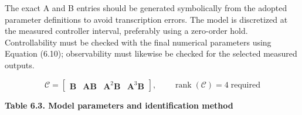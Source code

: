 The exact A and B entries should be generated symbolically from the
adopted parameter definitions to avoid transcription errors. The model
is discretized at the measured controller interval, preferably using a
zero-order hold. Controllability must be checked with the final
numerical parameters using Equation (6.10); observability must likewise
be checked for the selected measured outputs.

\begin{equation}
\mathcal{C}=\begin{bmatrix}\mathbf{B}&\mathbf{A}\mathbf{B}&\mathbf{A}^{2}\mathbf{B}&\mathbf{A}^{3}\mathbf{B}\end{bmatrix},
\qquad \operatorname{rank}(\mathcal{C})=4\;\text{required}
\label{eq:6-10}
\end{equation}

\par\medskip\noindent\singlespacing
{}
\textbf{Table 6.3. Model parameters and identification method}\par

